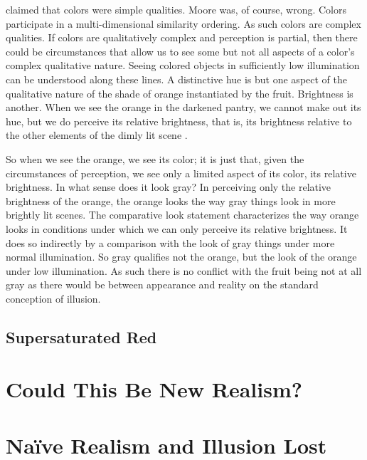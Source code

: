 \documentclass[12pt]{article}
\begin{document}
\citet{Moore:1903lr} claimed that colors were simple qualities. Moore was, of course, wrong. Colors participate in a multi-dimensional similarity ordering. As such colors are complex qualities. If colors are qualitatively complex and perception is partial, then there could be circumstances that allow us to see some but not all aspects of a color's complex qualitative nature. Seeing colored objects in sufficiently low illumination can be understood along these lines. A distinctive hue is but one aspect of the qualitative nature of the shade of orange instantiated by the fruit. Brightness is another. When we see the orange in the darkened pantry, we cannot make out its hue, but we do perceive its relative brightness, that is, its brightness relative to the other elements of the dimly lit scene \citep[see][]{Arthadeva:1961vn}.

So when we see the orange, we see its color; it is just that, given the circumstances of perception, we see only a limited aspect of its color, its relative brightness. In what sense does it look gray? In perceiving only the relative brightness of the orange, the orange looks the way gray things look in more brightly lit scenes. The comparative look statement characterizes the way orange looks in conditions under which we can only perceive its relative brightness. It does so indirectly by a comparison with the look of gray things under more normal illumination. So gray qualifies not the orange, but the look of the orange under low illumination. As such there is no conflict with the fruit being not at all gray as there would be between appearance and reality on the standard conception of illusion. 



\subsection{Supersaturated Red}\label{sub:supersaturated_red} %





\section{Could This Be New Realism?}\label{sec:could_this_be_new_realism_} %




\section{Naïve Realism and Illusion Lost}\label{sec:naïve_realism_and_illusion_lost} %




 
 
\end{document}
